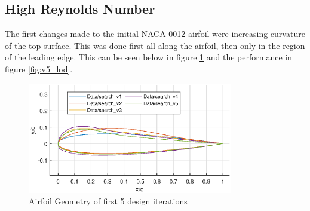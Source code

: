 \documentclass{article}
\begin{document}
\subsection{High Reynolds Number}

The first changes made to the initial NACA 0012 airfoil were increasing curvature of the top surface.
This was done first all along the airfoil, then only in the region of the leading edge.
This can be seen below in figure \ref{fig:v5_geometry} and the performance in figure \ref{fig:v5_lod}.

\begin{figure}[H]
    \centering
    \includegraphics[width=0.8\textwidth]{figures/hiRe_geometry_5.eps}
    \caption{Airfoil Geometry of first 5 design iterations}
    \label{fig:v5_geometry}
\end{figure}
\end{document}
